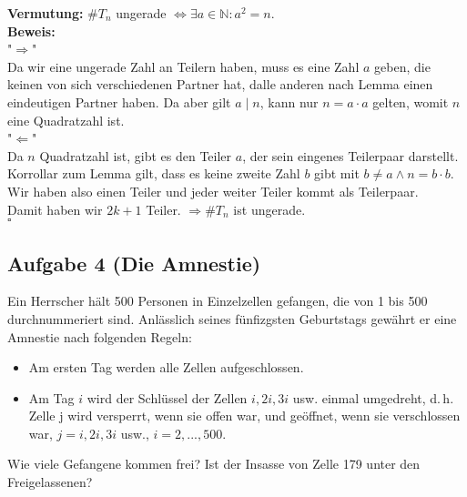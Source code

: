 \documentclass[11pt,a4paper,ngerman]{article}
\newcommand{\N}{\mathbb{N}}
\begin{document}
\begin{enumerate}[\bfseries a)]
\textbf{Vermutung:} $\#T_n$ ungerade $\Leftrightarrow \exists a\in \N : a^2 = n$.\\
\textbf{Beweis:}\\
"$\Rightarrow$"\\
Da wir eine ungerade Zahl an Teilern haben, muss es eine Zahl $a$ geben, die keinen von sich verschiedenen Partner hat, dalle anderen nach Lemma einen eindeutigen Partner haben. Da aber gilt $a\;|\;n$, kann nur $n = a \cdot a$ gelten, womit $n$ eine Quadratzahl ist.\\
"$\Leftarrow$"\\
Da $n$ Quadratzahl ist, gibt es den Teiler $a$, der sein eingenes Teilerpaar darstellt. Korrollar zum Lemma gilt, dass es keine zweite Zahl $b$ gibt mit $b\not=a \land n = b\cdot b$. Wir haben also einen Teiler und jeder weiter Teiler kommt als Teilerpaar.\\
Damit haben wir $2k + 1$ Teiler. $\Rightarrow \#T_n$ ist ungerade.\\
\mbox{} \hfill $\square$

\end{enumerate}




\subsection*{Aufgabe 4 (Die Amnestie)}

Ein Herrscher hält 500 Personen in Einzelzellen gefangen, die von 1 bis 500 durchnummeriert sind. Anlässlich seines fünfizgsten Geburtstags gewährt er eine Amnestie nach folgenden Regeln:

\begin{itemize}

\item Am ersten Tag werden alle Zellen aufgeschlossen.

\item Am Tag $i$ wird der Schlüssel der Zellen $i, 2i, 3i$ usw. einmal umgedreht, d.\,h. Zelle j wird versperrt, wenn sie offen war, und geöffnet, wenn sie verschlossen war, $j = i, 2i, 3i$ usw., $i = 2, ... , 500$.

\end{itemize}

Wie viele Gefangene kommen frei? Ist der Insasse von Zelle 179 unter den Freigelassenen?
\end{document}
